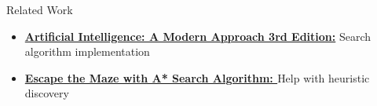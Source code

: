 \begin{frame}{Related Work}
    \begin{itemize}
        \item \textbf{\href{https://moodle.up.pt/pluginfile.php/196597/mod_resource/content/0/ArtificialIntelligence_ModernApproach_3rdEdition.pdf}{Artificial Intelligence: A Modern Approach 3rd Edition:}} Search algorithm implementation
        \item \textbf{\href{https://towardsdatascience.com/escape-the-maze-with-a-search-algorithm-bb0f1cf876e0}{Escape the Maze with A* Search Algorithm: }} Help with heuristic discovery
    \end{itemize}
\end{frame}